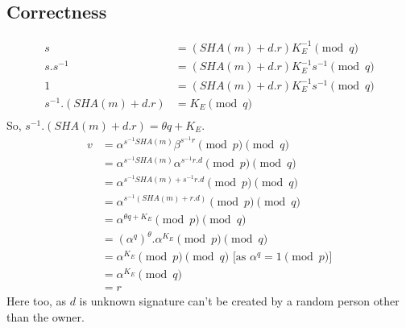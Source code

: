 \documentclass[english, 11pt]{article}
\begin{document}
\begin{figure}[ht]
\begin{tikzpicture}

\end{tikzpicture}

\centering   
\end{figure}

\subsection*{Correctness}

\begin{align*}
  s &= (SHA(m)+d.r) K_{E}^{-1} \pmod{q} \\
  s.s^{-1}&= (SHA(m)+d.r) K_{E}^{-1} s^{-1} \pmod{q} \\
  1 &= (SHA(m)+d.r) K_{E}^{-1} s^{-1} \pmod{q} \\
  s^{-1}.(SHA(m)+d.r) &= K_E \pmod{q} \\
\end{align*}
So, $s^{-1}.(SHA(m)+d.r) = \theta q + K_E$.
\begin{align*}
  v &= \alpha^{s^{-1}SHA(m)} \beta^{s^{-1}r} \pmod{p} \pmod{q}\\
  &= \alpha^{s^{-1}SHA(m)} \alpha^{s^{-1}r.d} \pmod{p} \pmod{q}\\
  &= \alpha^{s^{-1}SHA(m)+s^{-1}r.d} \pmod{p} \pmod{q}\\
  &= \alpha^{s^{-1}(SHA(m)+r.d)} \pmod{p} \pmod{q}\\
  &= \alpha^{\theta q + K_E} \pmod{p} \pmod{q}\\
  &= (\alpha^{q})^{\theta}.\alpha^{K_E} \pmod{p} \pmod{q}\\
  &= \alpha^{K_E} \pmod{p} \pmod{q} \text{     [as $\alpha^q = 1 \pmod{p}$]}\\
  &= \alpha^{K_E} \pmod{q} \\
  &= r
\end{align*}
Here too, as $d$ is unknown signature can't be created by a random person other than the owner.
\end{document}
